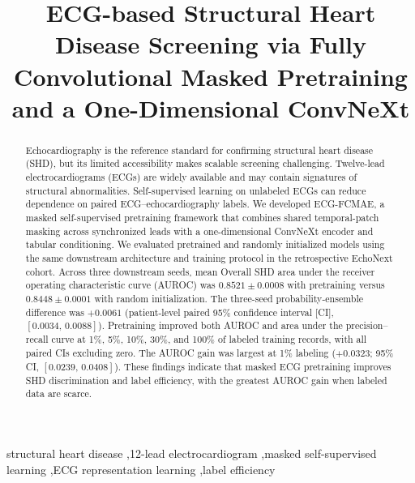 \documentclass[preprint,12pt,nonatbib]{elsarticle}
\begin{document}
\begin{frontmatter}

\title{ECG-based Structural Heart Disease Screening via Fully Convolutional Masked Pretraining and a One-Dimensional ConvNeXt}

\begin{abstract}
Echocardiography is the reference standard for confirming structural heart disease (SHD), but its limited accessibility makes scalable screening challenging. Twelve-lead electrocardiograms (ECGs) are widely available and may contain signatures of structural abnormalities. Self-supervised learning on unlabeled ECGs can reduce dependence on paired ECG--echocardiography labels. We developed ECG-FCMAE, a masked self-supervised pretraining framework that combines shared temporal-patch masking across synchronized leads with a one-dimensional ConvNeXt encoder and tabular conditioning. We evaluated pretrained and randomly initialized models using the same downstream architecture and training protocol in the retrospective EchoNext cohort. Across three downstream seeds, mean Overall SHD area under the receiver operating characteristic curve (AUROC) was $0.8521\pm0.0008$ with pretraining versus $0.8448\pm0.0001$ with random initialization. The three-seed probability-ensemble difference was $+0.0061$ (patient-level paired 95\% confidence interval [CI], $[0.0034,\,0.0088]$). Pretraining improved both AUROC and area under the precision--recall curve at 1\%, 5\%, 10\%, 30\%, and 100\% of labeled training records, with all paired CIs excluding zero. The AUROC gain was largest at 1\% labeling ($+0.0323$; 95\% CI, $[0.0239,\,0.0408]$). These findings indicate that masked ECG pretraining improves SHD discrimination and label efficiency, with the greatest AUROC gain when labeled data are scarce.
\end{abstract}

\begin{keyword}
structural heart disease \sep 12-lead electrocardiogram \sep masked self-supervised learning \sep ECG representation learning \sep label efficiency
\end{keyword}

\end{frontmatter}



\BSPCprintbibliography
\end{document}
